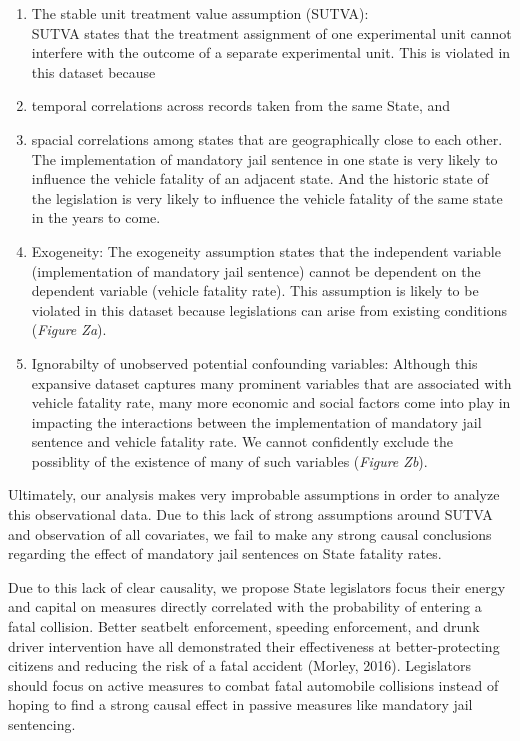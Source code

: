 \documentclass[]{article}
\begin{document}
\begin{enumerate}
\def\labelenumi{\arabic{enumi}.}
\item
  The stable unit treatment value assumption (SUTVA):\\
  SUTVA states that the treatment assignment of one experimental unit
  cannot interfere with the outcome of a separate experimental unit.
  This is violated in this dataset because\\
\item
  temporal correlations across records taken from the same State, and
\item
  spacial correlations among states that are geographically close to
  each other.\\
  The implementation of mandatory jail sentence in one state is very
  likely to influence the vehicle fatality of an adjacent state. And the
  historic state of the legislation is very likely to influence the
  vehicle fatality of the same state in the years to come.
\item
  Exogeneity: The exogeneity assumption states that the independent
  variable (implementation of mandatory jail sentence) cannot be
  dependent on the dependent variable (vehicle fatality rate). This
  assumption is likely to be violated in this dataset because
  legislations can arise from existing conditions (\emph{Figure Za}).
\item
  Ignorabilty of unobserved potential confounding variables: Although
  this expansive dataset captures many prominent variables that are
  associated with vehicle fatality rate, many more economic and social
  factors come into play in impacting the interactions between the
  implementation of mandatory jail sentence and vehicle fatality rate.
  We cannot confidently exclude the possiblity of the existence of many
  of such variables (\emph{Figure Zb}).
\end{enumerate}

Ultimately, our analysis makes very improbable assumptions in order to
analyze this observational data. Due to this lack of strong assumptions
around SUTVA and observation of all covariates, we fail to make any
strong causal conclusions regarding the effect of mandatory jail
sentences on State fatality rates.

Due to this lack of clear causality, we propose State legislators focus
their energy and capital on measures directly correlated with the
probability of entering a fatal collision. Better seatbelt enforcement,
speeding enforcement, and drunk driver intervention have all
demonstrated their effectiveness at better-protecting citizens and
reducing the risk of a fatal accident (Morley, 2016). Legislators should
focus on active measures to combat fatal automobile collisions instead
of hoping to find a strong causal effect in passive measures like
mandatory jail sentencing.
\end{document}
